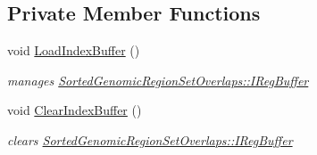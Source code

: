 \subsection*{Private Member Functions}
\begin{DoxyCompactItemize}
\item 
\hypertarget{classSortedGenomicRegionSetOverlaps_ad894d118c61c3cd11be8b37b8f185120}{
void \hyperlink{classSortedGenomicRegionSetOverlaps_ad894d118c61c3cd11be8b37b8f185120}{LoadIndexBuffer} ()}
\label{classSortedGenomicRegionSetOverlaps_ad894d118c61c3cd11be8b37b8f185120}

\begin{DoxyCompactList}\small\item\em manages \hyperlink{classSortedGenomicRegionSetOverlaps_a19fa18e6abd9f045786698fff48a445f}{SortedGenomicRegionSetOverlaps::IRegBuffer} \end{DoxyCompactList}\item 
\hypertarget{classSortedGenomicRegionSetOverlaps_ac5fe4552253a9d9d802d76b0f4356947}{
void \hyperlink{classSortedGenomicRegionSetOverlaps_ac5fe4552253a9d9d802d76b0f4356947}{ClearIndexBuffer} ()}
\label{classSortedGenomicRegionSetOverlaps_ac5fe4552253a9d9d802d76b0f4356947}

\begin{DoxyCompactList}\small\item\em clears \hyperlink{classSortedGenomicRegionSetOverlaps_a19fa18e6abd9f045786698fff48a445f}{SortedGenomicRegionSetOverlaps::IRegBuffer} \end{DoxyCompactList}\end{DoxyCompactItemize}

